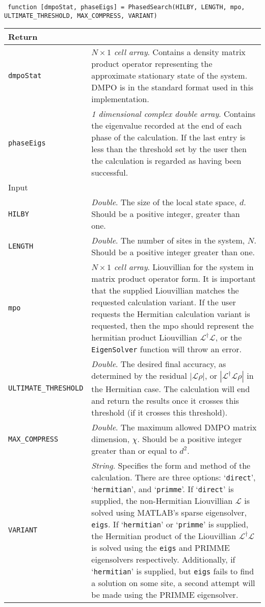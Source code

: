  \begin{lstlisting}
 function [dmpoStat, phaseEigs] = PhasedSearch(HILBY, LENGTH, mpo, ULTIMATE_THRESHOLD, MAX_COMPRESS, VARIANT) \end{lstlisting}
 \begin{longtabu}{X[1,1]X[4,1]}
 \hline
 Return & \\ \hline
 \lstinline$dmpoStat$ & \emph{\(N \times 1\) cell array}. Contains a density matrix product operator representing the approximate stationary state of the system. DMPO is in the standard format used in this implementation. \\
 \lstinline$phaseEigs$ & \emph{1 dimensional complex double array}. Contains the eigenvalue recorded at the end of each phase of the calculation. If the last entry is less than the threshold set by the user then the calculation is regarded as having been successful. \\ \hline
 Input & \\ \hline
 \lstinline$HILBY$ & \emph{Double}. The size of the local state space, \(d\). Should be a positive integer, greater than one. \\
 \lstinline$LENGTH$ & \emph{Double}. The number of sites in the system, \(N\). Should be a positive integer greater than one. \\
 \lstinline$mpo$ & \emph{\(N \times 1\) cell array}. Liouvillian for the system in matrix product operator form. It is important that the supplied Liouvillian matches the requested calculation variant. If the user requests the Hermitian calculation variant is requested, then the mpo should represent the hermitian product Liouvillian \(\mathcal{L}^{\dagger}\mathcal{L}\), or the \lstinline$EigenSolver$ function will throw an error. \\
 \lstinline$ULTIMATE_THRESHOLD$ & \emph{Double}. The desired final accuracy, as determined by the residual \(|\mathcal{L}\rho|\), or \(|\mathcal{L}^{\dagger}\mathcal{L}\rho|\) in the Hermitian case. The calculation will end and return the results once it crosses this threshold (if it crosses this threshold). \\
 \lstinline$MAX_COMPRESS$ & \emph{Double}. The maximum allowed DMPO matrix dimension, \(\chi\). Should be a positive integer greater than or equal to \(d^{2}\). \\
 \lstinline$VARIANT$ & \emph{String}. Specifies the form and method of the calculation. There are three options: `\lstinline$direct$', `\lstinline$hermitian$', and `\lstinline$primme$'. If `\lstinline$direct$' is supplied, the non-Hermitian Liouvillian \(\mathcal{L}\) is solved using MATLAB's sparse eigensolver, \lstinline$eigs$. If `\lstinline$hermitian$' or `\lstinline$primme$' is supplied, the Hermitian product of the Liouvillian \(\mathcal{L}^{\dagger}\mathcal{L}\) is solved using the \lstinline$eigs$ and PRIMME eigensolvers respectively. Additionally, if `\lstinline$hermitian$' is supplied, but \lstinline$eigs$ fails to find a solution on some site, a second attempt will be made using the PRIMME eigensolver. \\
 \hline
 \end{longtabu}
